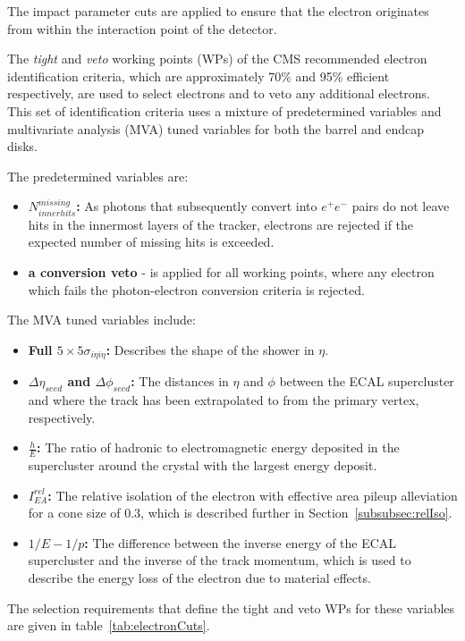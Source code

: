 The impact parameter cuts are applied to ensure that the electron originates from within the interaction point of the detector.

The \emph{tight} and \emph{veto} working points (WPs) of the CMS recommended electron identification criteria, which are approximately  70\% and 95\% efficient respectively, are used to select electrons and to veto any additional electrons.
This set of identification criteria uses a mixture of predetermined variables and multivariate analysis (MVA) tuned variables for both the barrel and endcap disks.

The predetermined variables are:
\begin{itemize}
\item \textbf{$N^{missing}_{inner hits}$:} As photons that subsequently convert into $e^{+} e^{-}$ pairs do not leave hits in the innermost layers of the tracker, electrons are rejected if the expected number of missing hits is exceeded.
\item \textbf{a conversion veto} - is applied for all working points, where any electron which fails the photon-electron conversion criteria is rejected.
\end{itemize}

The MVA tuned variables include:
\begin{itemize}
\item \textbf{Full $5 \times 5 \sigma_{i\eta i\eta}$:} Describes the shape of the shower in $\eta$.
\item \textbf{$\Delta \eta_{seed}$ and $\Delta \phi_{seed}$:} The distances in $\eta$ and $\phi$ between the ECAL supercluster and where the track has been extrapolated to from the primary vertex, respectively.
\item \textbf{$\frac{h}{E}$:} The ratio of hadronic to electromagnetic energy deposited in the supercluster around the crystal with the largest energy deposit.
\item \textbf{$I^{rel}_{EA}$:} The relative isolation of the electron with effective area pileup alleviation for a cone size of 0.3, which is described further in Section~\ref{subsubsec:relIso}.
\item \textbf{$1/E - 1/p$:} The difference between the inverse energy of the ECAL supercluster and the inverse of the track momentum, which is used to describe the energy loss of the electron due to material effects.
\end{itemize}

The selection requirements that define the tight and veto WPs for these variables are given in table~\ref{tab:electronCuts}.

